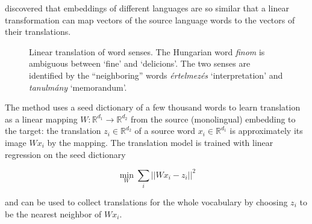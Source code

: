 \documentclass[11pt]{article}
\newcommand{\Ro}{\mathbb{R}^{d_1}}
\newcommand{\Rt}{\mathbb{R}^{d_2}}
\begin{document}
 \cite{Mikolov:2013x} discovered that embeddings of different languages are so
 similar that a linear transformation can map vectors of the source language
 words to the vectors of their translations.  

\begin{figure}[b]
    \centering
    \resizebox{\columnwidth}{!} {
    }
    \caption{Linear translation of word senses. The Hungarian word
        \emph{finom} is ambiguous between `fine' and `delicions'.  The two
        senses are identified by the ``neighboring'' words \emph{értelmezés}
    `interpretation' and \emph{tanulmány} `memorandum'.
    } \label{fig:AdaGram}
\end{figure}

The method uses a seed dictionary of a few thousand words to learn translation
as a linear mapping $W: \mathbb{R}^{d_1}\rightarrow \mathbb{R}^{d_2}$ from the
source (monolingual) embedding to the target: the translation $z_i \in \Rt$ of
a source word $x_i \in \Ro$ is approximately its image $Wx_i$ by the mapping.
The translation model is trained with linear regression on the seed dictionary

\[\min_W \sum_i || Wx_i - z_i ||^2 \]

\noindent and can be used to collect translations for the whole vocabulary by
choosing $z_i$ to be the nearest neighbor of $Wx_i$.

\end{document}
